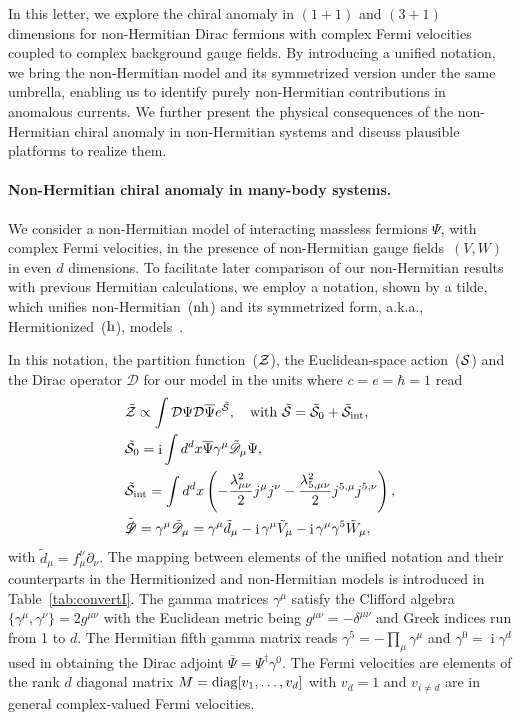 \documentclass[prl,aps,showpacs,twocolumn,preprintnumbers,
amsmath,amssymb,superscriptaddress,longbibliography]{revtex4-1}
\renewcommand{\i}{\mathop{\mathrm{i}}}
\newcommand{\scr}[1]{\mathscr #1}
\begin{document}
In this letter, we explore the chiral anomaly in $(1+1)$ and $(3+1)$ dimensions for non-Hermitian Dirac fermions with complex Fermi velocities coupled to complex background gauge fields. By introducing a unified notation, we bring the non-Hermitian model and its symmetrized version under the same umbrella, enabling us to identify purely non-Hermitian contributions in anomalous currents. We further present the physical consequences of the non-Hermitian chiral anomaly in non-Hermitian systems and discuss plausible platforms to realize them.






\paragraph*{ Non-Hermitian chiral anomaly in many-body systems.}
We consider a non-Hermitian model of interacting massless fermions $\Psi$, with complex Fermi velocities, in the presence of non-Hermitian gauge fields~$(V, W)$ in even $d$ dimensions. To facilitate later comparison of our non-Hermitian results with previous Hermitian calculations, we employ a notation, shown by a tilde, which unifies non-Hermitian~($\rm nh$) and its symmetrized form, a.k.a., Hermitionized~($\rm h$), models~\cite{Sayyad2022ca}.

 In this notation, the partition function~($\cal Z$), the Euclidean-space action~($\cal S$) and the Dirac operator ${\scr D}$ for our model in the units where $c=e=\hbar=1$ read
\begin{align}
    &\tilde{\cal Z} \propto \int {\cal D}\Psi {\cal D}\overline{\Psi} e^{\tilde{\cal S}}
    , \quad 
    \text{with    }
    \tilde{\cal S}=\tilde{\cal S}_{0}+\tilde{\cal S}_{\rm int}
    \label{eq:action_int}
    ,\\
    & \tilde{\cal S}_{0} = \i \int d^{d} x \overline{\Psi} \gamma^{\mu} \tilde{\scr{ D}}_{\mu} \Psi
    ,\\
      & \tilde{\cal S}_{\rm int} = \int d^{d} x 
      \left(
    -\frac{\lambda_{\mu \nu}^{2}}{2} j^{\mu} j^{\nu}
    -\frac{\lambda_{5,\mu \nu}^{2}}{2} j^{5,\mu} j^{5,\nu}
      \right)
    ,\\
   & \tilde{\slashed{\scr D}} =\gamma^{\mu} \tilde{\scr{ D}}_{\mu} = \gamma^{\mu} \tilde{d}_{\mu} - \i \gamma^{\mu} \tilde{V}_{\mu} -\i \gamma^{\mu}  \gamma^{5} \tilde{W}_{\mu},
\end{align}
 with $\tilde{d}_{\mu}= f_{\mu}^{\nu} \partial_{\nu}$. The mapping between elements of the unified notation and their counterparts in the Hermitionized and non-Hermitian models is introduced in Table~\ref{tab:convertI}.
The gamma matrices $\gamma^{\mu}$ satisfy the Clifford algebra $\{ \gamma^{\mu}, \gamma^{\nu}\}=2 g^{\mu \nu}$ with the Euclidean metric being $g^{\mu \nu} =- \delta^{\mu \nu}$ and Greek indices run from 1 to $d$. The Hermitian fifth gamma matrix reads $\gamma^{5}=-\prod_{\mu} \gamma^{\mu}$ and $\gamma^{0}=\i \gamma^{d}$ used in obtaining the Dirac adjoint $\overline{\Psi}= \Psi^{\dagger} \gamma^{0}$. The Fermi velocities are elements of the rank $d$ diagonal matrix $M={\rm diag}[v_{1}, \ldots, v_{d}]$ with $v_{d}=1$ and $v_{i \neq d}$ are in general complex-valued Fermi velocities. 
\end{document}
